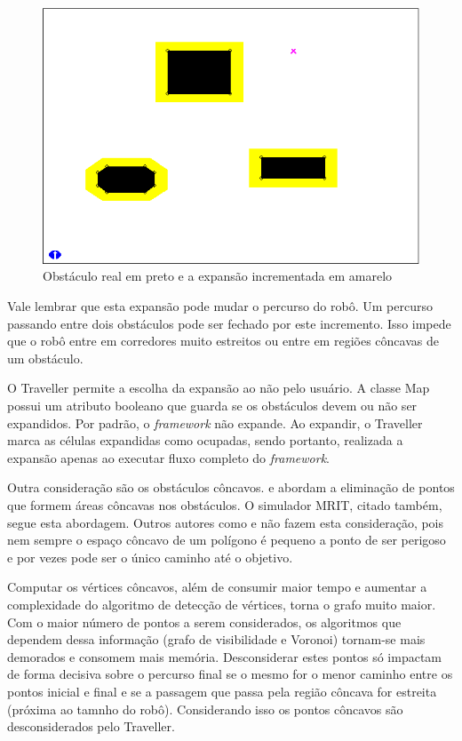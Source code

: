 \begin{figure}[h]
	\centering
	\label{fig34}
		\includegraphics[keepaspectratio=true,scale=0.5]{figuras/expansao.png}
	\caption{Obstáculo real em preto e a expansão incrementada em amarelo \cite{MRIT_SITE}}
\end{figure}

Vale lembrar que esta expansão pode mudar o percurso do robô. Um percurso passando entre dois obstáculos pode ser fechado por este incremento. Isso impede que o robô entre em corredores muito estreitos ou entre em regiões côncavas de um obstáculo.

O Traveller permite a escolha da expansão ao não pelo usuário. A classe Map possui um atributo booleano que guarda se os obstáculos devem ou não ser expandidos. Por padrão, o \textit{framework} não expande. Ao expandir, o Traveller marca as células expandidas como ocupadas, sendo portanto, realizada a expansão apenas ao executar fluxo completo do \textit{framework}.

Outra consideração são os obstáculos côncavos. \cite{Siegwart2004} e \cite{Guzman2008} abordam a eliminação de pontos que formem áreas côncavas nos obstáculos. O simulador MRIT, citado também, segue esta abordagem. Outros autores como \cite{Thomsen2010} e \cite{Choset2005} não fazem esta consideração, pois nem sempre o espaço côncavo de um polígono é pequeno a ponto de ser perigoso e por vezes pode ser o único caminho até o objetivo. 

Computar os vértices côncavos, além de consumir maior tempo e aumentar a complexidade do algoritmo de detecção de vértices, torna o grafo muito maior. Com o maior número de pontos a serem considerados, os algoritmos que dependem dessa informação (grafo de visibilidade e Voronoi) tornam-se mais demorados e consomem mais memória. Desconsiderar estes pontos só impactam de forma decisiva sobre o percurso final se o mesmo for o menor caminho entre os pontos inicial e final e se a passagem que passa pela região côncava for estreita (próxima ao tamnho do robô). Considerando isso os pontos côncavos são desconsiderados pelo Traveller.

